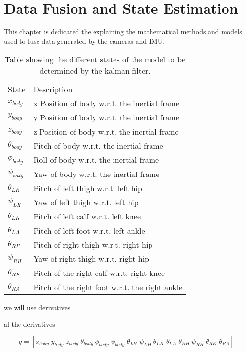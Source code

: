 \chapter{Data Fusion and State Estimation}

This chapter is dedicated the explaining the mathematical methods and models used to fuse data generated by the cameras and IMU.

\begin{table}[!ht]
\centering
\label{statesForEkf}
\begin{tabular}{ll}
State & Description \\
$x_{body}$  	    	&x Position of body w.r.t. the inertial frame\\
$y_{body}$     	 	    &y Position of body w.r.t. the inertial frame\\
$z_{body}$     		    &z Position of body w.r.t. the inertial frame\\
$\theta_{body}$      	&Pitch of body w.r.t. the inertial frame\\
$\phi_{body}$      	    &Roll of body w.r.t. the inertial frame\\
$\psi_{body}$      	    &Yaw of body w.r.t. the inertial frame\\
$\theta_{LH}$     	&Pitch of left thigh w.r.t. left hip\\
$\psi_{LH}$      	&Yaw of left thigh w.r.t. left hip\\
$\theta_{LK}$    	&Pitch of left calf w.r.t. left knee\\
$\theta_{LA}$   	&Pitch of left foot w.r.t. left ankle\\
$\theta_{RH}$    	&Pitch of right thigh w.r.t. right hip\\
$\psi_{RH}$      	&Yaw of right thigh w.r.t. right hip\\
$\theta_{RK}$   	&Pitch of the right calf w.r.t. right knee\\
$\theta_{RA}$  		&Pitch of the right foot w.r.t. the right ankle\\
\end{tabular}
\caption{Table showing the different states of the model to be determined by the kalman filter.}
\end{table}

we will use derivatives

al the derivatives

$$ 					q = [ 
x_{body}        	\; 	    	
y_{body}        	\;    	 	    
z_{body}        	\;    		    
\theta_{body}   	\;   	
\phi_{body}     	\;  	  
\psi_{body}     	\;    
\theta_{LH}    		\;
\psi_{LH}   		\;
\theta_{LK}   		\;
\theta_{LA}   		\;
\theta_{RH}    		\;
\psi_{RH}    		\;
\theta_{RK}   		\;
\theta_{RA}  		
]					$$ 

